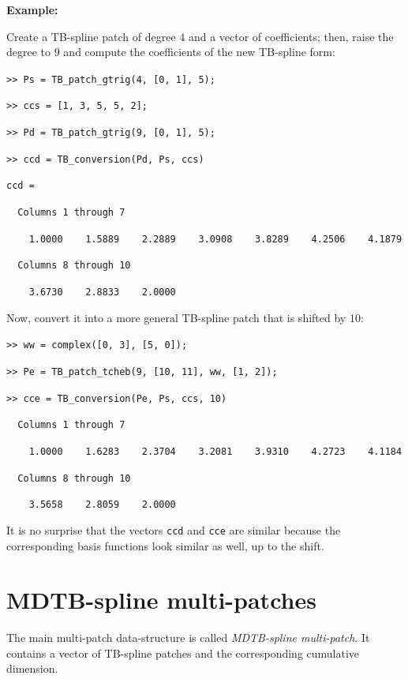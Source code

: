 \documentclass[10pt]{acmtrans2e}
\newenvironment{example}
{\vspace*{0.1cm}
\noindent \textbf{Example:} \vspace*{0.15cm}

\setlength{\parskip}{0.5ex plus 0.5exminus 0.2 ex}
}
{\medskip
}
\begin{document}
\begin{example}
\noindent Create a TB-spline patch of degree $4$ and a vector of coefficients; then, raise the degree to $9$ and compute the coefficients of the new TB-spline form:
\medskip

\texttt{>> Ps = TB\_patch\_gtrig(4, [0, 1], 5);}

\texttt{>> ccs = [1, 3, 5, 5, 2];}

\texttt{>> Pd = TB\_patch\_gtrig(9, [0, 1], 5);}

\texttt{>> ccd = TB\_conversion(Pd, Ps, ccs)}

\texttt{ccd =}

\texttt{\ \ Columns 1 through 7}

\texttt{\ \ \ \ 1.0000\ \ \ \ 1.5889\ \ \ \ 2.2889\ \ \ \ 3.0908\ \ \ \ 3.8289\ \ \ \ 4.2506\ \ \ \ 4.1879}

\texttt{\ \ Columns 8 through 10}

\texttt{\ \ \ \ 3.6730\ \ \ \ 2.8833\ \ \ \ 2.0000}

\medskip
\noindent Now, convert it into a more general TB-spline patch that is shifted by $10$:
\medskip

\texttt{>> ww = complex([0, 3], [5, 0]);}

\texttt{>> Pe = TB\_patch\_tcheb(9, [10, 11], ww, [1, 2]);}

\texttt{>> cce = TB\_conversion(Pe, Ps, ccs, 10)}


\texttt{\ \ Columns 1 through 7}

\texttt{\ \ \ \ 1.0000\ \ \ \ 1.6283\ \ \ \ 2.3704\ \ \ \ 3.2081\ \ \ \ 3.9310\ \ \ \ 4.2723\ \ \ \ 4.1184}

\texttt{\ \ Columns 8 through 10}

\texttt{\ \ \ \ 3.5658\ \ \ \ 2.8059\ \ \ \ 2.0000}

\medskip
\noindent It is no surprise that the vectors \texttt{ccd} and \texttt{cce} are similar because the corresponding basis functions look similar as well, up to the shift.
\end{example}


\section{MDTB-spline multi-patches}\label{sec:matlab-mdtb}

The main multi-patch data-structure is called \emph{MDTB-spline multi-patch}. It contains a vector of TB-spline patches and the corresponding cumulative dimension. 
\end{document}
